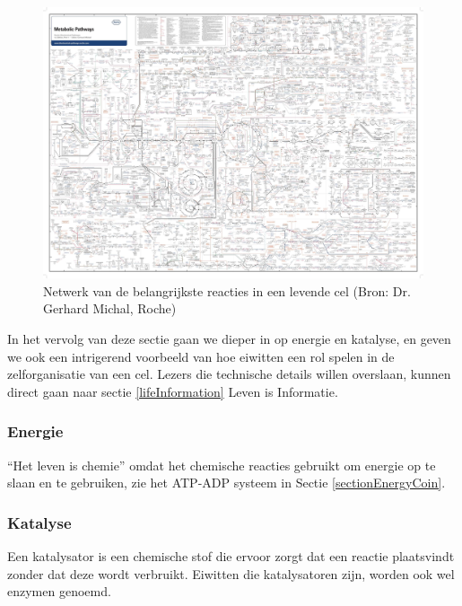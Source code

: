 \documentclass[
  11pt,
]{book}
\begin{document}
\begin{figure}

{\centering \includegraphics[width=1\linewidth]{./figs/roche_pathways} 

}

\caption{Netwerk van de belangrijkste reacties in een levende cel (Bron: Dr. Gerhard Michal, Roche)}\label{fig:chemicalReactionsCell}
\end{figure}

In het vervolg van deze sectie gaan we dieper in op energie en katalyse, en geven we ook een intrigerend voorbeeld van hoe eiwitten een rol spelen in de zelforganisatie van een cel. Lezers die technische details willen overslaan, kunnen direct gaan naar sectie \ref{lifeInformation} Leven is Informatie.

\hypertarget{energie}{%
\subsubsection{Energie}\label{energie}}

``Het leven is chemie'' omdat het chemische reacties gebruikt om energie op te slaan en te gebruiken, zie het ATP-ADP systeem in Sectie \ref{sectionEnergyCoin}.

\hypertarget{katalyse}{%
\subsubsection{Katalyse}\label{katalyse}}

Een katalysator is een chemische stof die ervoor zorgt dat een reactie plaatsvindt zonder dat deze wordt verbruikt. Eiwitten die katalysatoren zijn, worden ook wel enzymen genoemd.
\end{document}

